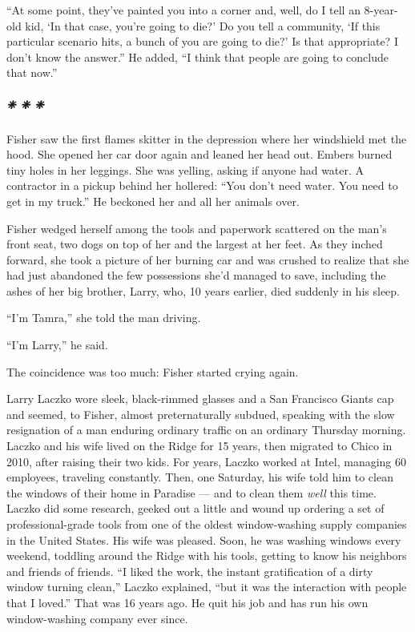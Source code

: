``At some point, they've painted you into a corner and, well, do I tell
an 8-year-old kid, `In that case, you're going to die?' Do you tell a
community, `If this particular scenario hits, a bunch of you are going
to die?' Is that appropriate? I don't know the answer.'' He added, ``I
think that people are going to conclude that now.''

\hypertarget{---1}{%
\subparagraph{❈ ❈ ❈}\label{---1}}

Fisher saw the first flames skitter in the depression where her
windshield met the hood. She opened her car door again and leaned her
head out. Embers burned tiny holes in her leggings. She was yelling,
asking if anyone had water. A contractor in a pickup behind her
hollered: ``You don't need water. You need to get in my truck.'' He
beckoned her and all her animals over.

Fisher wedged herself among the tools and paperwork scattered on the
man's front seat, two dogs on top of her and the largest at her feet. As
they inched forward, she took a picture of her burning car and was
crushed to realize that she had just abandoned the few possessions she'd
managed to save, including the ashes of her big brother, Larry, who, 10
years earlier, died suddenly in his sleep.

``I'm Tamra,'' she told the man driving.

``I'm Larry,'' he said.

The coincidence was too much: Fisher started crying again.

Larry Laczko wore sleek, black-rimmed glasses and a San Francisco Giants
cap and seemed, to Fisher, almost preternaturally subdued, speaking with
the slow resignation of a man enduring ordinary traffic on an ordinary
Thursday morning. Laczko and his wife lived on the Ridge for 15 years,
then migrated to Chico in 2010, after raising their two kids. For years,
Laczko worked at Intel, managing 60 employees, traveling constantly.
Then, one Saturday, his wife told him to clean the windows of their home
in Paradise --- and to clean them \emph{well} this time. Laczko did some
research, geeked out a little and wound up ordering a set of
professional-grade tools from one of the oldest window-washing supply
companies in the United States. His wife was pleased. Soon, he was
washing windows every weekend, toddling around the Ridge with his tools,
getting to know his neighbors and friends of friends. ``I liked the
work, the instant gratification of a dirty window turning clean,''
Laczko explained, ``but it was the interaction with people that I
loved.'' That was 16 years ago. He quit his job and has run his own
window-washing company ever since.

